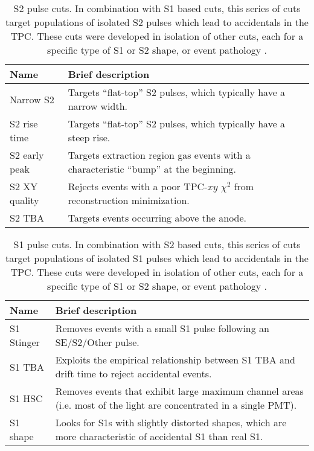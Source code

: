 \begin{table}[h!]
    \centering
    \caption[S2 pulse cuts used in the veto efficiency studies.]{S2 pulse cuts. In combination with S1 based cuts, this series of cuts target populations of isolated S2 pulses which lead to accidentals in the TPC. These cuts were developed in isolation of other cuts, each for a specific type of S1 or S2 shape, or event pathology \cite{mwilliams:thesis}.}
    \begin{tabular}{|m{10em}m{29em}|}
    \hline
    \textbf{Name}&\textbf{Brief description}\\
    \hline\hline
    Narrow S2 &Targets “flat-top” S2 pulses, which typically have a narrow width.\\
    \hline
    S2 rise time & Targets “flat-top” S2 pulses, which typically have a steep rise.\\
    \hline
    S2 early peak & Targets extraction region gas events with a characteristic “bump” at the beginning.\\
    \hline
    S2 XY quality & Rejects events with a poor TPC-$xy$ $\chi^2$ from reconstruction minimization.\\
    \hline
    S2 TBA & Targets events occurring above the anode.\\
    \hline
    \end{tabular}
\end{table}
\begin{table}[h!]
    \centering
    \caption[S1 pulse cuts used in the veto efficiency studies.]{S1 pulse cuts. In combination with S2 based cuts, this series of cuts target populations of isolated S1 pulses which lead to accidentals in the TPC. These cuts were developed in isolation of other cuts, each for a specific type of S1 or S2 shape, or event pathology \cite{mwilliams:thesis}.}
    \begin{tabular}{|m{10em}m{29em}|}
    \hline
    \textbf{Name}&\textbf{Brief description}\\
    \hline\hline
    S1 Stinger & Removes events with a small S1 pulse following an SE/S2/Other pulse.\\
    \hline
    S1 TBA & Exploits the empirical relationship between S1 TBA and drift time to reject accidental events.\\
    \hline
    S1 HSC & Removes events that exhibit large maximum channel areas (i.e. most of the light are concentrated in a single PMT).\\
    \hline
    S1 shape & Looks for S1s with slightly distorted shapes, which are more characteristic of accidental S1 than real S1.\\
    \hline
    \end{tabular}
\end{table}